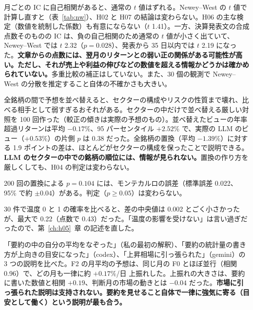 \documentclass[xelatex,ja=standard,jafont=haranoaji,a4paper,10pt,openany]{bxjsreport}
\newcommand{\tabref}[1]{表~\ref{#1}}
\newcommand{\chapref}[1]{第~\ref{#1}~章}
\begin{document}
\begin{description}[leftmargin=2em,style=nextline,itemsep=0.4em]
\item[自己相関（codex の指摘）] 月ごとの IC に自己相関があると、通常の $t$ 値はずれる。Newey--West の $t$ 値で計算し直すと（\tabref{tab:nw}）、H02 と H07 の結論は変わらない。H06 の主な検定（数値を統制した係数）も有意にならない（$t$ 1.41）。一方、決算発表文の合成点数そのものの IC は、負の自己相関のため通常の $t$ 値が小さく出ていて、Newey--West では $t$ 2.32（$p=0.028$）、発表から 35 日以内では $t$ 2.19 になった。\textbf{文章からの点数には、翌月のリターンとの弱い正の関係がある可能性が高い。ただし、それが売上や利益の伸びなどの数値を超える情報かどうかは確かめられていない。}多重比較の補正はしていない。また、30 個の観測で Newey--West の分散を推定すること自体の不確かさも大きい。
\item[置換の作り方（両モデルの指摘）] 全銘柄の間で予想を並べ替えると、セクターの構成やリスクの性質まで壊れ、比べる相手として弱すぎるおそれがある。セクターの中だけで並べ替える厳しい対照を 100 回作った（較正の傾きは実際の予想のもの）。並べ替えたビューの年率超過リターンは平均 $-0.17\%$、95 パーセンタイル $+2.52\%$ で、実際の LLM のビュー（$+0.53\%$）の片側 $p$ は 0.38 だった。全銘柄の置換（平均 $-1.39\%$）に対する 1.9 ポイントの差は、ほとんどがセクターの構成を保ったことで説明できる。\textbf{LLM のセクターの中での銘柄の順位には、情報が見られない。}置換の作り方を厳しくしても、H04 の判定は変わらない。
\item[置換の $p$ 値の誤差（codex の指摘）] 200 回の置換による $p=0.104$ には、モンテカルロの誤差（標準誤差 0.022、95\% で約 $\pm0.04$）がある。判定（$p\ge0.05$）は変わらない。
\item[H05 の温度（codex の指摘）] 30 件で温度 0 と 1 の確率を比べると、差の中央値は 0.002 とごく小さかったが、最大で 0.22（点数で 0.43）だった。「温度の影響を受けない」は言い過ぎだったので、\chapref{ch:h05} の記述を直した。
\item[H07 の楽観の原因（両モデルの指摘）] 「要約の中の自分の平均をなぞった」（私の最初の解釈）、「要約の統計量の書き方が上向きの目安になった」（codex）、「上昇相場に引っ張られた」（gemini）の 3 つの説明を比べた。F2 の月平均の予想は、同じ月の F0 とほぼ並行（相関 0.96）で、どの月も一律に約 $+0.17\%$/日 上振れした。上振れの大きさは、要約に書いた数値と相関 $+0.19$、判断月の市場の動きとは $-0.04$ だった。\textbf{市場に引っ張られた説明は支持されない。要約を見せること自体で一律に強気に寄る（目安として働く）という説明が最も合う。}
\end{description}
\end{document}
